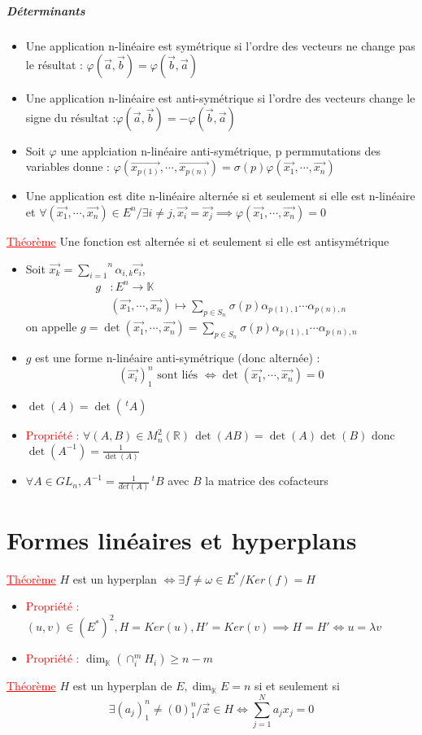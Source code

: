 \documentclass[a4paper, 11pt, french]{article}
\newcommand{\R}{\mathbb{R}}
\newcommand{\K}{\mathbb{K}}
\newcommand{\al}{\alpha}
\newcommand{\la}{\lambda}
\newcommand{\ph}{\varphi}
\newcommand{\som}[2]{\overset{#2}{\underset{#1}{\sum}}}
\newcommand{\thm}{\textcolor{red}{\underline{Théorème} }}
\newcommand{\ppt}{\textcolor{red}{Propriété : }}
\newcommand{\inv}[1]{\frac{1}{#1}}
\begin{document}
	\subparagraph*{Déterminants}
	\begin{itemize}
 		\item Une application n-linéaire est symétrique si l'ordre des vecteurs ne change pas le résultat : $\ph(\vec{a},\vec{b})=\ph(\vec{b},\vec{a})$
 		\item Une application n-linéaire est anti-symétrique si l'ordre des vecteurs change le signe du résultat :$\ph(\vec{a},\vec{b})= - \ph(\vec{b},\vec{a})$
 		\item Soit $\ph$ une applciation n-linéaire anti-symétrique, p permmutations des variables donne : $\ph(\vec{x_{p(1)}},\cdots,\vec{x_{p(n)}})= \sigma(p) \ph(\vec{x_1},\cdots,\vec{x_n})$
 		\item Une application est dite n-linéaire alternée si et seulement si elle est n-linéaire et $\forall (\vec{x_1},\cdots,\vec{x_n}) \in E^n / \exists i  \neq j, \vec{x_i}=\vec{x_j} \implies \ph(\vec{x_1},\cdots,\vec{x_n})=0$
	\end{itemize}
	 \thm Une fonction est alternée si et seulement si elle est antisymétrique
	\begin{itemize}
 		\item Soit $\vec{x_k}=\som{i=1}{n}\al_{i,k}\vec{e_i}$, 
			\begin{align*}
				g &: E^n \rightarrow \K \\
				&(\vec{x_1},\cdots,\vec{x_n}) \mapsto \som{p\in S_n}{}\sigma(p)\al_{p(1),1}\cdots\al_{p(n),n}
			\end{align*}
			on appelle $g=\det(\vec{x_1},\cdots,\vec{x_n})=\som{p\in S_n}{}\sigma(p)\al_{p(1),1}\cdots\al_{p(n),n}$
 		\item $g$ est une forme n-linéaire anti-symétrique (donc alternée) : $$(\vec{x_i})_1^n \text{ sont liés }\iff \det(\vec{x_1},\cdots,\vec{x_n})=0$$
 		\item $\det(A)=\det(\,^tA)$
 		\item \ppt $\forall (A,B)\in M_n^2(\R) \, \det(AB)=\det(A)\det(B)$ donc $\det(A^{-1})=\inv{\det(A)}$
 		\item $\forall A \in GL_n, A^{-1}=\inv{det(A)}\,^tB$ avec $B$ la matrice des cofacteurs
	\end{itemize}

	\section*{Formes linéaires et hyperplans}
	 \thm $H$ est un hyperplan $\iff \exists f \neq \omega \in E^* / Ker(f)=H$
	\begin{itemize}
 		\item \ppt $(u,v)\in (E^*)^2, H=Ker(u), H'=Ker(v) \implies H=H' \iff u=\la v$
 		\item \ppt $\dim_{\K}(\cap_i^m H_i)\geqslant n-m$
	\end{itemize}
	 \thm $H$ est un hyperplan de $E, \dim_{\K}E=n$ si et seulement si $$\exists (a_j)_1^n \neq (0)_1^n / \vec{x} \in H \iff \som{j=1}{N}a_jx_j=0$$
\end{document}
